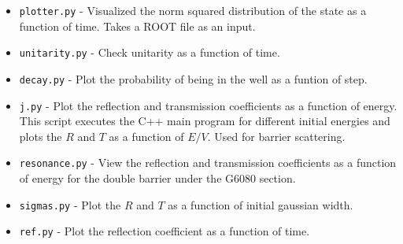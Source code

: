 \documentclass[singlepage,notitlepage,nofootinbib,11pt]{revtex4-1}
\begin{document}
\begin{itemize}
\item \texttt{plotter.py} - Visualized the norm squared distribution of the state as a function of time. Takes a ROOT file as an input.
\item \texttt{unitarity.py} - Check unitarity as a function of time.
\item \texttt{decay.py} - Plot the probability of being in the well as a funtion of step.
\item \texttt{j.py} - Plot the reflection and transmission coefficients as a function of energy. This script executes the C++ main program for different initial energies and plots the $R$ and $T$ as a function of $E/V$. Used for barrier scattering.
\item \texttt{resonance.py} - View the reflection and transmission coefficients as a function of energy for the double barrier under the G6080 section.
\item \texttt{sigmas.py} - Plot the $R$ and $T$ as a function of initial gaussian width.
  \item \texttt{ref.py} - Plot the reflection coefficient as a function of time.
 \end{itemize}
\end{document}
